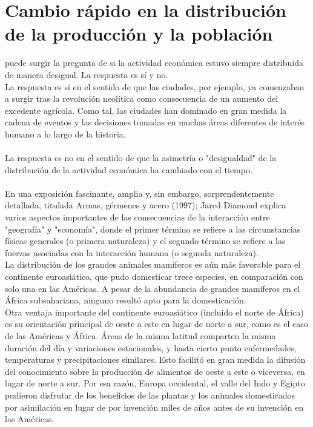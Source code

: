 \section{Cambio rápido en la distribución de la producción y la población}
    puede surgir la pregunta de si la actividad económica estuvo siempre distribuida de manera desigual. La respuesta es sí y no.\\
    La respuesta es sí en el sentido de que las ciudades, por ejemplo, ya comenzaban a surgir tras la revolución neolítica como consecuencia de un aumento del excedente agrícola. Como tal, las ciudades han dominado en gran medida la cadena de eventos y las decisiones tomadas en muchas áreas diferentes de interés humano a lo largo de la historia.\\\\
    La respuesta es no en el sentido de que la asimetría o "desigualdad" de la distribución de la actividad económica ha cambiado con el tiempo.\\\\
    En una exposición fascinante, amplia y, sin embargo, sorprendentemente detallada, titulada Armas, gérmenes y acero (1997); Jared Diamond explica varios aspectos importantes de las consecuencias de la interacción entre "geografía" y "economía", donde el primer término se refiere a las circunstancias físicas generales (o primera naturaleza) y el segundo término se refiere a las fuerzas asociadas con la interacción humana (o segunda naturaleza).\\
    La distribución de los grandes animales mamíferos es aún más favorable para el continente euroasiático, que pudo domesticar trece especies, en comparación con solo una en las Américas. A pesar de la abundancia de grandes mamíferos en el África subsahariana, ninguno resultó apto para la domesticación.\\
    Otra ventaja importante del continente euroasiático (incluido el norte de África) es su orientación principal de oeste a este en lugar de norte a sur, como es el caso de las Américas y África. Áreas de la misma latitud comparten la misma duración del día y variaciones estacionales, y hasta cierto punto enfermedades, temperaturas y precipitaciones similares. Esto facilitó en gran medida la difusión del conocimiento sobre la producción de alimentos de oeste a este o viceversa, en lugar de norte a sur. Por esa razón, Europa occidental, el valle del Indo y Egipto pudieron disfrutar de los beneficios de las plantas y los animales domesticados por asimilación en lugar de por invención miles de años antes de su invención en las Américas.


